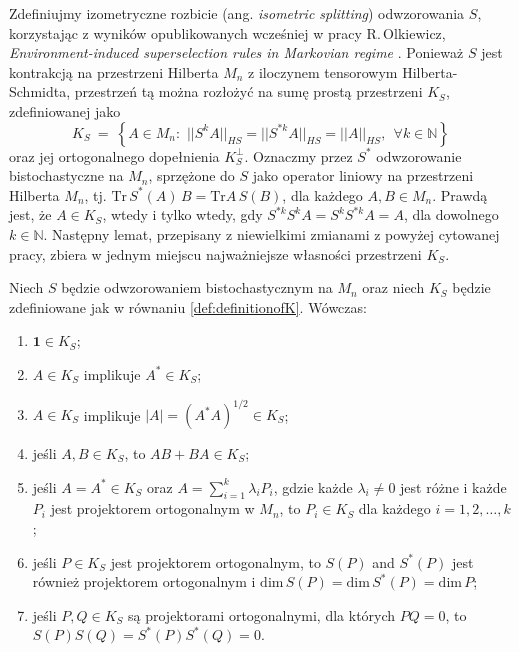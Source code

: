 Zdefiniujmy izometryczne rozbicie (ang. \emph{isometric splitting})
odwzorowania $S$, korzystając z wyników opublikowanych wcześniej w pracy
R.\,Olkiewicz, \emph{Environment-induced superselection rules in Markovian regime}
\cite{olkiewicz1999environment}.
Ponieważ $S$ jest kontrakcją na przestrzeni Hilberta $M_{n}$
z iloczynem tensorowym Hilberta-Schmidta,
przestrzeń tą można rozłożyć na sumę prostą przestrzeni $K_{S}$,
zdefiniowanej jako
\begin{equation}
\label{def:definitionofK}
    K_{S} \: = \: \left\{
        A \in M_{n}: \,\,
            || S^{k} A ||_{HS} = || S^{* k} A ||_{HS} = || A ||_{HS}, \:\:
            \forall k \in \mathbb{N}
        \right\}
\end{equation}
oraz jej ortogonalnego dopełnienia $K_{S}^{\perp}$.
Oznaczmy przez $S^{*}$ odwzorowanie bistochastyczne na $M_{n}$,
sprzężone do $S$ jako operator liniowy na przestrzeni Hilberta $M_{n}$,
tj. $\text{Tr}\, S^{*} (A)\, B = \text{Tr} A \, S(B)$,
dla każdego $A, B \in M_{n}$.
Prawdą jest, że $A \in K_{S}$,
wtedy i tylko wtedy, gdy
$S^{* k} S^{k} A = S^{k} S^{* k} A = A$,
dla dowolnego $k \in \mathbb{N}$.
Następny lemat, przepisany z niewielkimi zmianami z
powyżej cytowanej pracy,
zbiera w jednym miejscu najważniejsze własności przestrzeni $K_{S}$.

\begin{Lemma}
\label{lem:propertiesofK}
Niech $S$ będzie odwzorowaniem bistochastycznym na $M_{n}$
oraz niech $K_{S}$ będzie zdefiniowane jak w równaniu
\eqref{def:definitionofK}.
Wówczas:
\let \oldlabelenumi \labelenumi
\renewcommand{\labelenumi}{\alph{enumi})}
\begin{enumerate}
\item $\mathbf{1} \in K_{S}$;
\item $A \in K_{S}$ implikuje $A^{*} \in K_{S}$;
\item  $A  \in K_{S}$ implikuje
$|A| = (A^{*}A)^{1/2} \in K_{S}$;
\item jeśli $A, B \in K_{S}$, to $AB + BA \in K_{S}$;
\item jeśli $A = A^{*} \in K_{S}$ oraz $A = \sum_{i=1}^{k} \lambda_{i} P_{i}$,
gdzie każde $\lambda_{i} \neq 0$ jest różne i
każde $P_{i}$ jest projektorem ortogonalnym w $M_{n}$,
to $P_{i} \in K_{S}$ dla każdego $i = 1,2,\ldots,k$;
\item jeśli $P \in K_{S}$ jest projektorem ortogonalnym,
to $S(P)$ and $S^{*}(P)$ jest również projektorem ortogonalnym i
$\mathrm{dim} \, S(P) = \mathrm{dim} \, S^{*}(P) = \mathrm{dim} \, P$;
\item jeśli $P, Q \in K_{S}$ są projektorami ortogonalnymi, dla których
$P Q = 0$,
to $S(P) S(Q) = S^{*}(P) S^{*}(Q) = 0$.
\end{enumerate}
\let \labelenumi \oldlabelenumi
\end{Lemma}

